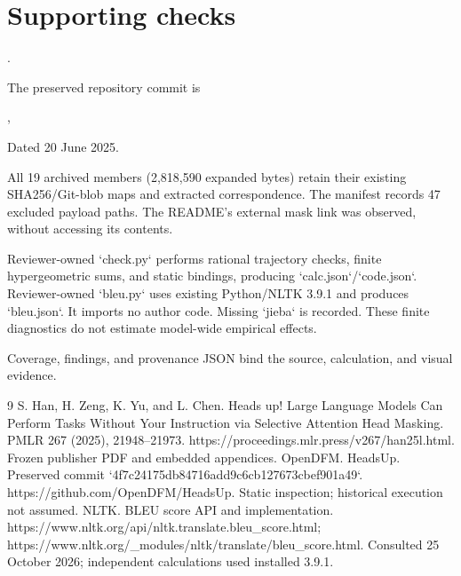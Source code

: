 \documentclass[10pt]{article}
\begin{document}
\section*{Supporting checks}
.\par
The preserved repository commit is\par
,\par
Dated 20 June 2025.\par
All 19 archived members (2,818,590 expanded bytes) retain their existing SHA256/Git-blob maps and extracted correspondence. The manifest records 47 excluded payload paths. The README’s external mask link was observed, without accessing its contents.\par
Reviewer-owned `check.py` performs rational trajectory checks, finite hypergeometric sums, and static bindings, producing `calc.json`/`code.json`. Reviewer-owned `bleu.py` uses existing Python/NLTK 3.9.1 and produces `bleu.json`. It imports no author code. Missing `jieba` is recorded. These finite diagnostics do not estimate model-wide empirical effects.\par
Coverage, findings, and provenance JSON bind the source, calculation, and visual evidence.\par
9 S. Han, H. Zeng, K. Yu, and L. Chen. Heads up! Large Language Models Can Perform Tasks Without Your Instruction via Selective Attention Head Masking. PMLR 267 (2025), 21948–21973. https://proceedings.mlr.press/v267/han25l.html. Frozen publisher PDF and embedded appendices. OpenDFM. HeadsUp. Preserved commit `4f7c24175db84716add9c6cb127673cbef901a49`. https://github.com/OpenDFM/HeadsUp. Static inspection; historical execution not assumed. NLTK. BLEU score API and implementation. https://www.nltk.org/api/nltk.translate.bleu\_score.html; https://www.nltk.org/\_modules/nltk/translate/bleu\_score.html. Consulted 25 October 2026; independent calculations used installed 3.9.1.\par
\end{document}
